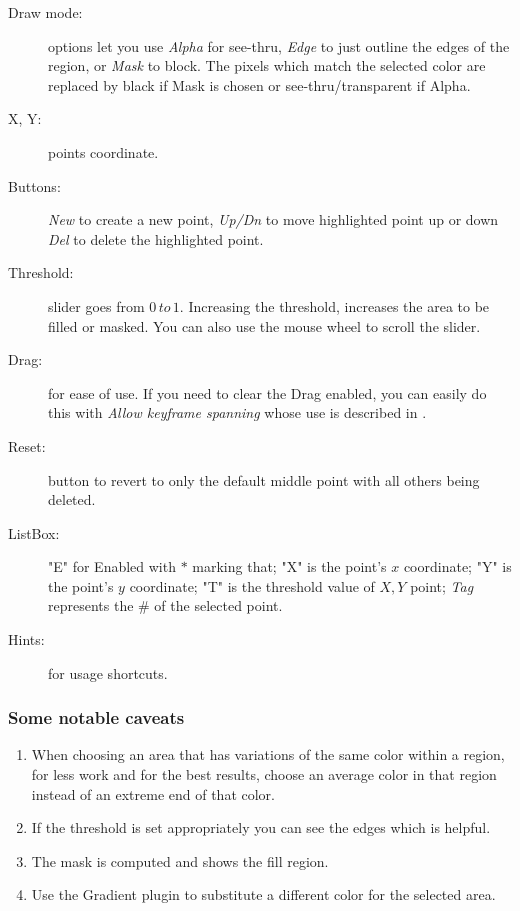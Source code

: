\begin{description}
    \item[Draw mode:] options let you use \textit{Alpha} for see-thru, \textit{Edge} to just outline the edges of the region, or \textit{Mask} to block. The pixels which match the selected color are replaced by black if Mask is chosen or see-thru/transparent if Alpha.
    \item[X, Y:] points coordinate.
    \item[Buttons:] \textit{New} to create a new point, \textit{Up/Dn} to move highlighted point up or down \textit{Del} to delete the highlighted point.
    \item[Threshold:] slider goes from $0\, to\, 1$. Increasing the threshold, increases the area to be filled or masked. You can also use the mouse wheel to scroll the slider.
    \item[Drag:] for ease of use. If you need to clear the Drag enabled, you can easily do this with \textit{Allow keyframe spanning} whose use is described in .
    \item[Reset:] button to revert to only the default middle point with all others being deleted.
    \item[ListBox:] "E" for Enabled with $*$ marking that; "X" is the point’s $x$ coordinate; "Y" is the point’s $y$ coordinate; "T" is the threshold value of $X,Y$ point; \textit{Tag} represents the \# of the selected
    point.
    \item[Hints:] for usage shortcuts.
\end{description}

\subsubsection*{Some notable caveats}
\label{ssub:some_notable_caveats}

\begin{enumerate}
    \item When choosing an area that has variations of the same color within a region, for less work and for the best results, choose an average color in that region instead of an extreme end of that color.
    \item If the threshold is set appropriately you can see the edges which is helpful.
    \item The mask is computed and shows the fill region.
    \item Use the Gradient plugin to substitute a different color for the selected area.
\end{enumerate}

